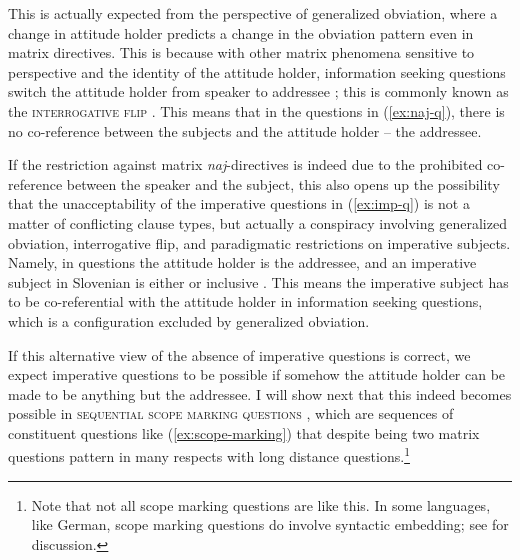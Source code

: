 \documentclass[output=paper,colorlinks,citecolor=brown]{langscibook}
\begin{document}
\ea \label{ex:naj-q} 
\z\z

\noindent This is actually expected from the perspective of generalized obviation, where a change in attitude holder predicts a change in the obviation pattern even in matrix directives. This is because with other matrix phenomena sensitive to perspective and the identity of the attitude holder, information seeking questions switch the attitude holder from speaker to addressee \citep{garrett01,faller02,speastenny03,zu18}; this is commonly known as the \textsc{interrogative flip} \citep{tenny06}. This means that in the questions in (\ref{ex:naj-q}), there is no co-reference between the \fst{} subjects and the attitude holder -- the addressee. 

If the restriction against \fst{} matrix \emph{naj}-directives is indeed due to the prohibited co-reference between the speaker and the subject, this also opens up the possibility that the unacceptability of the imperative questions in (\ref{ex:imp-q}) is not a matter of conflicting clause types, but actually a conspiracy involving generalized obviation, interrogative flip, and paradigmatic restrictions on imperative subjects. Namely, in questions the attitude holder is the addressee, and an imperative subject in Slovenian is either \snd{} or inclusive \fst. This means the imperative subject has to be co-referential with the attitude holder in information seeking questions, which is a configuration excluded by generalized obviation. 

If this alternative view of the absence of imperative questions is correct, we expect imperative questions to be possible if somehow the attitude holder can be made to be anything but the addressee. I will show next that this indeed becomes possible in \textsc{sequential scope marking questions} \citep[][]{dayal00}, which are sequences of constituent questions like (\ref{ex:scope-marking}) that despite being two matrix questions pattern in many respects with long distance questions.\footnote{Note that not all scope marking questions are like this. In some languages, like German, scope marking questions do involve syntactic embedding; see \citet{dayal93,dayal00} for discussion.}
\end{document}
